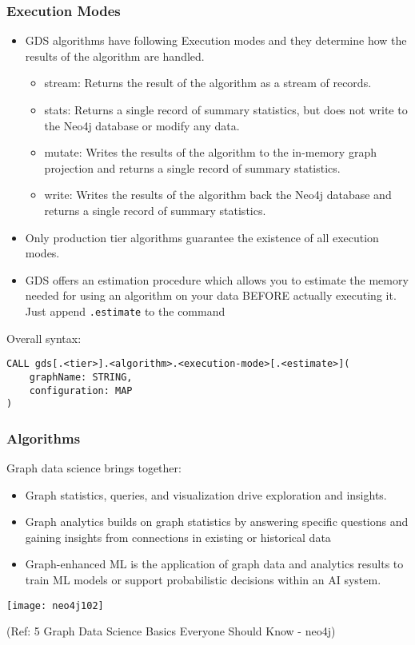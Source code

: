 \begin{frame}[fragile]\frametitle{Execution Modes}

\begin{itemize}
\item GDS algorithms have following Execution modes and they determine how the results of the algorithm are handled.
	\begin{itemize}
	\item stream: Returns the result of the algorithm as a stream of records.
	\item stats: Returns a single record of summary statistics, but does not write to the Neo4j database or modify any data.
	\item mutate: Writes the results of the algorithm to the in-memory graph projection and returns a single record of summary statistics.
	\item write: Writes the results of the algorithm back the Neo4j database and returns a single record of summary statistics.
	\end{itemize}
\item Only production tier algorithms guarantee the existence of all execution modes.
\item GDS offers an estimation procedure which allows you to estimate the memory needed for using an algorithm on your data BEFORE actually executing it. Just append \lstinline|.estimate| to the command
\end{itemize}


Overall syntax:

\begin{lstlisting}
CALL gds[.<tier>].<algorithm>.<execution-mode>[.<estimate>](
	graphName: STRING,
	configuration: MAP
)
\end{lstlisting}

\end{frame}


\begin{frame}[fragile]\frametitle{Algorithms}
Graph data science brings together:
\begin{itemize}
\item Graph statistics, queries, and visualization drive exploration and insights. 
\item Graph analytics builds on graph statistics by answering specific questions and gaining 
insights from connections in existing or historical data
\item Graph-enhanced ML is the application of graph data and analytics results to train ML models 
or support probabilistic decisions within an AI system.
\end{itemize}

\begin{center}
\texttt{[image: neo4j102]}
\end{center}	

{\tiny (Ref: 5 Graph Data Science Basics Everyone Should Know  - neo4j)}
\end{frame}




